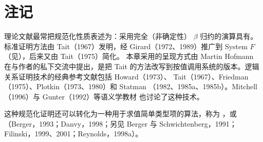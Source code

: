 \section{注记}
\label{sec:12.2}

理论文献最常把规范化性质表述为：采用完全（非确定性）
\(\beta\) 归约的演算具有。
标准证明方法由 Tait（1967）发明，经 Girard（1972、1989）推广到
System \(F\)（见），后来又由 Tait（1975）简化。
本章采用的呈现方式由 Martin Hofmann 在与作者的私下交流中提出，是把
Tait 的方法改写到按值调用系统的版本。逻辑关系证明技术的经典参考文献包括
Howard（1973）、
Tait（1967）、Friedman（1975）、Plotkin（1973、1980）和 Statman
（1982、1985a、1985b）。Mitchell（1996）与 Gunter（1992）等语义学教材
也讨论了这种技术。

这种规范化证明还可以转化为一种用于求值简单类型项的算法，称为
，或
（Berger，1993；Danvy，1998；另见 Berger 与 Schwichtenberg，1991；
Filinski，1999、2001；Reynolds，1998a）。

